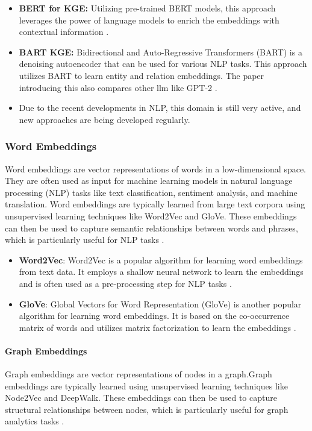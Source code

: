     \begin{itemize}
        \item \textbf{BERT for KGE:} Utilizing pre-trained BERT models, this approach leverages the power of language models to enrich the embeddings with contextual information \cite{KGBERT19}.
        \item \textbf{BART KGE:} Bidirectional and Auto-Regressive Transformers (BART) is a denoising autoencoder that can be used for various NLP tasks. This approach utilizes BART to learn entity and relation embeddings. The paper introducing this also compares other \acrshort{llm} like GPT-2 \cite{KGBART21}.
        \item Due to the recent developments in NLP, this domain is still very active, and new approaches are being developed regularly.
    \end{itemize}

    \subsubsection{Word Embeddings}
    Word embeddings are vector representations of words in a low-dimensional space. They are often used as input for machine learning models in natural language processing (NLP) tasks like text classification, sentiment analysis, and machine translation. Word embeddings are typically learned from large text corpora using unsupervised learning techniques like Word2Vec and GloVe. These embeddings can then be used to capture semantic relationships between words and phrases, which is particularly useful for NLP tasks \cite{UnderstandingWordEmbeddingsAndLM20}.

    \begin{itemize}
        \item \textbf{Word2Vec}: Word2Vec is a popular algorithm for learning word embeddings from text data. It employs a shallow neural network to learn the embeddings and is often used as a pre-processing step for NLP tasks \cite{KG22}.
        \item \textbf{GloVe}: Global Vectors for Word Representation (GloVe) is another popular algorithm for learning word embeddings. It is based on the co-occurrence matrix of words and utilizes matrix factorization to learn the embeddings \cite{KG22}.
    \end{itemize}

    \paragraph{Graph Embeddings}
    Graph embeddings are vector representations of nodes in a graph.Graph embeddings are typically learned using unsupervised learning techniques like Node2Vec and DeepWalk. These embeddings can then be used to capture structural relationships between nodes, which is particularly useful for graph analytics tasks \cite{KG21}.
    
